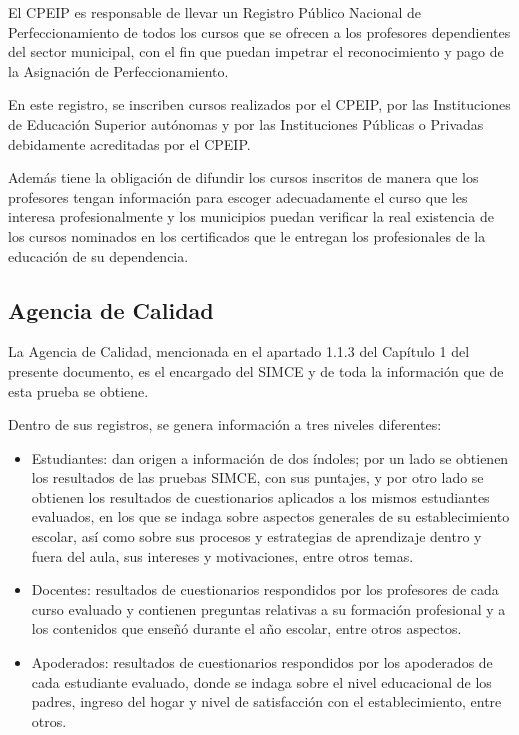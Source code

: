 \begin{longdescription}
    El CPEIP es responsable de llevar un Registro Público Nacional de Perfeccionamiento de todos los cursos que se ofrecen a los profesores dependientes del sector municipal, con el fin que puedan impetrar el reconocimiento y pago de la Asignación de Perfeccionamiento.
    
    En este registro, se inscriben cursos realizados por el CPEIP, por las Instituciones de Educación Superior autónomas y por las Instituciones Públicas o Privadas debidamente acreditadas por el CPEIP.
    
    Además tiene la obligación de difundir los cursos inscritos de manera que los profesores tengan información para escoger adecuadamente el curso que les interesa profesionalmente y los municipios puedan verificar la real existencia de los cursos nominados en los certificados que le entregan los profesionales de la educación de su dependencia.
\end{longdescription}

\subsection{Agencia de Calidad}
La Agencia de Calidad, mencionada en el apartado 1.1.3 del Capítulo 1 del presente documento, es el encargado del SIMCE y de toda la información que de esta prueba se obtiene. 

Dentro de sus registros, se genera información a tres niveles diferentes: 
\begin{itemize}
\item Estudiantes: dan origen a información de dos índoles; por un lado se obtienen los resultados de las pruebas SIMCE, con sus puntajes, y por otro lado se obtienen los resultados de cuestionarios aplicados a los mismos estudiantes evaluados, en los que se indaga sobre aspectos generales de su establecimiento escolar, así como sobre sus procesos y estrategias de aprendizaje dentro y fuera del aula, sus intereses y motivaciones, entre otros temas.
\item Docentes: resultados de cuestionarios respondidos por los profesores de cada curso evaluado y contienen preguntas relativas a su formación profesional y a los contenidos que enseñó durante el año escolar, entre otros aspectos.
\item Apoderados: resultados de cuestionarios respondidos por los apoderados de cada estudiante evaluado, donde se indaga sobre el nivel educacional de los padres, ingreso del hogar y nivel de satisfacción con el establecimiento, entre otros.
\end{itemize}

